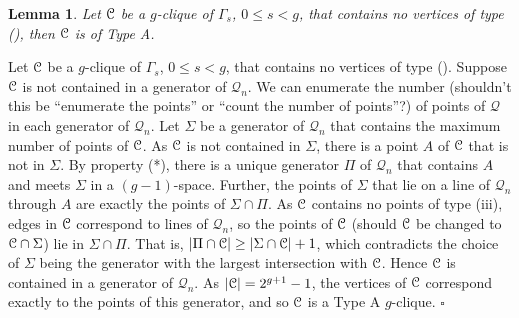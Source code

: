 \documentclass[12pt]{article}
\newtheorem{lemma}[theorem]{Lemma}
\newenvironment{proof}{\noindent{\bf Proof}\hspace{0.5em}}
    { \null  \hfill $\square$ \par}
\newcommand\C{{\cal C}}
\newcommand{\Q}{\mathscr Q}
\newcommand{\Label}{\label}
\newcommand\TODO[1]{{\color{Purple} #1}}
\newcommand\tthree{{\rm (\romannumeral 3)}}
\begin{document}
\begin{lemma}\Label{conv-g-cliq-1} Let $\C$ be a $g$-clique of $\Gamma_s$, $0\le s < g$, that contains no vertices of type \tthree, then $\C$ is of Type A.
\end{lemma}

\begin{proof}
Let $\C$ be a $g$-clique of $\Gamma_s$, $0\le s < g$, that contains no vertices of type \tthree. Suppose $\C$ is not contained in a generator of $\Q_n$. We can enumerate the number \TODO{(shouldn't this be ``enumerate the points'' or ``count the number of points''?)} of points of $\Q$ in each generator of $\Q_n$. Let $\Sigma$ be a generator of $\Q_n$ that contains the maximum number of points of $\C$. As $\C$ is not contained in $\Sigma$, there is a point $A$ of $\C$ that is not in $\Sigma$. By property (*), there is a unique generator $\Pi$ of $\Q_n$ that contains $A$ and meets $\Sigma$ in a $(g-1)$-space. Further, the points of $\Sigma$ that lie on a line of $\Q_n$ through $A$ are exactly the points of $\Sigma\cap\Pi$. 
 As $\C$ contains no points of type (iii), edges in $\C$ correspond to lines of $\Q_n$, so the points of $\C$ \TODO{(should $\C$ be changed to $\C\cap\Sigma$)} lie in $\Sigma\cap\Pi$. That is, $|\Pi\cap\C|\geq |\Sigma\cap\C|+1$, which contradicts the choice of $\Sigma$ \TODO{being the generator with the largest intersection with $\C$}. Hence $\C$ is contained in a generator of $\Q_n$. As $|\C|=2^{g+1}-1$, the vertices of $\C$ correspond exactly to the points of this generator, and so $\C$ is a Type A $g$-clique.
\end{proof}
\end{document}
